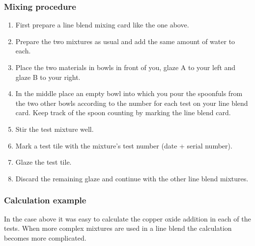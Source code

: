 \subsubsection{Mixing procedure}
\begin{enumerate}
\item First prepare a line blend mixing card like the one above.
\item Prepare the two mixtures as usual and add the same amount of water to 
each.
\item Place the two materials in bowls in front of you, glaze A to your left 
and glaze B to your right.
\item In the middle place an empty bowl into which you pour the spoonfuls from 
the two other bowls according to the number for each test on your line blend 
card. Keep track of the spoon counting by marking the line blend card.
\item Stir the test mixture well.
\item Mark a test tile with the mixture's test number (date + serial number).
\item Glaze the test tile.
\item Discard the remaining glaze and continue with the other line blend 
mixtures.
\end{enumerate}

\subsubsection{Calculation example}
In the case above it was easy to calculate the copper oxide addition in each of 
the tests. When more complex mixtures are used in a line blend the calculation 
becomes more complicated. 

